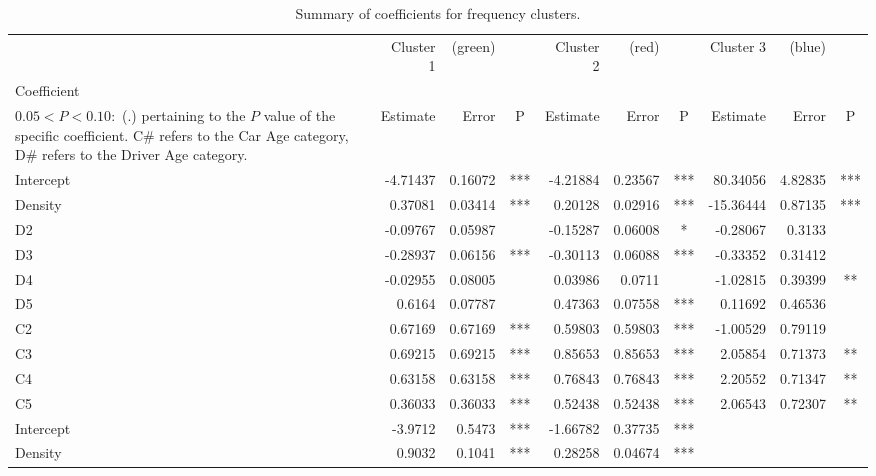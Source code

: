 \documentclass[12pt,letterpaper]{article}
\numberwithin{equation}{section}
\numberwithin{equation}{section}
\numberwithin{equation}{section}
\begin{document}
\begin{center}
\begin{table}
\caption{Summary of coefficients for frequency clusters.}
\label{frequencySummary}
\begin{tabular}{l|rrc|rrc|rrc}
\hline
          & Cluster 1 & (green) &   & Cluster 2 & (red) &  & Cluster 3 & (blue) &   \\
Coefficient \footnote{The significance codes are defined as $  P < 0.001 : $  (***), $0.001 < P < 0.01:$ (**), $  0.01 < P < 0.05:$ (*),\\ $0.05 < P < 0.10 : $ (.) %
pertaining to the $P$ value of the specific coefficient. C\# refers to the Car Age category, D\# refers to the Driver Age category.  }         & Estimate  & Error & P   & Estimate  & Error   & P   & Estimate  & Error  & P  \\
 \hline
Intercept & -4.71437 & 0.16072 & *** & -4.21884 & 0.23567 & *** & 80.34056  & 4.82835 & *** \\
Density   & 0.37081  & 0.03414 & *** & 0.20128  & 0.02916 & *** & -15.36444 & 0.87135 & *** \\
D2        & -0.09767 & 0.05987 &     & -0.15287 & 0.06008 & *   & -0.28067  & 0.3133  &     \\
D3        & -0.28937 & 0.06156 & *** & -0.30113 & 0.06088 & *** & -0.33352  & 0.31412 &     \\
D4        & -0.02955 & 0.08005 &     & 0.03986  & 0.0711  &     & -1.02815  & 0.39399 & **  \\
D5        & 0.6164   & 0.07787 &     & 0.47363  & 0.07558 & *** & 0.11692   & 0.46536 &     \\
C2        & 0.67169  & 0.67169 & *** & 0.59803  & 0.59803 & *** & -1.00529  & 0.79119 &     \\
C3        & 0.69215  & 0.69215 & *** & 0.85653  & 0.85653 & *** & 2.05854   & 0.71373 & **  \\
C4        & 0.63158  & 0.63158 & *** & 0.76843  & 0.76843 & *** & 2.20552   & 0.71347 & **  \\
C5        & 0.36033  & 0.36033 & *** & 0.52438  & 0.52438 & *** & 2.06543   & 0.72307 & **  \\
\hline
Intercept & -3.9712  & 0.5473  & *** & -1.66782 & 0.37735 & *** &           &         &     \\
Density   & 0.9032   & 0.1041  & *** & 0.28258  & 0.04674 & *** &           &         &    \\
\hline
\end{tabular}
\end{table}
\end{center}
\newpage
\end{document}
